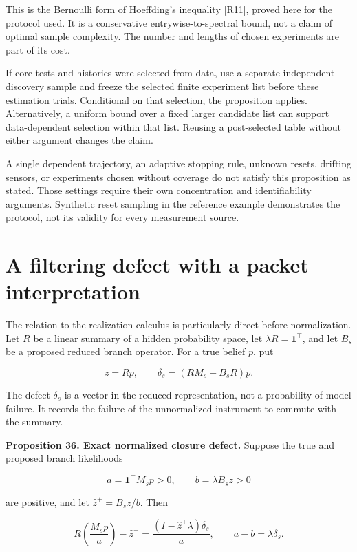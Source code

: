 This is the Bernoulli form of Hoeffding's inequality {[}R11{]}, proved
here for the protocol used. It is a conservative entrywise-to-spectral
bound, not a claim of optimal sample complexity. The number and lengths
of chosen experiments are part of its cost.

If core tests and histories were selected from data, use a separate
independent discovery sample and freeze the selected finite experiment
list before these estimation trials. Conditional on that selection, the
proposition applies. Alternatively, a uniform bound over a fixed larger
candidate list can support data-dependent selection within that list.
Reusing a post-selected table without either argument changes the claim.

A single dependent trajectory, an adaptive stopping rule, unknown
resets, drifting sensors, or experiments chosen without coverage do not
satisfy this proposition as stated. Those settings require their own
concentration and identifiability arguments. Synthetic reset sampling in
the reference example demonstrates the protocol, not its validity for
every measurement source.

\section{A filtering defect with a packet interpretation}\label{LSM:a-filtering-defect-with-a-packet-interpretation}

The relation to the realization calculus is particularly direct before
normalization. Let \(R\) be a linear summary of a hidden probability
space, let \(\lambda R=\mathbf1^\top\), and let \(B_s\) be a proposed
reduced branch operator. For a true belief \(p\), put

\[
z=Rp,\qquad
\delta_s=(RM_s-B_sR)p.
\]

The defect \(\delta_s\) is a vector in the reduced representation, not a
probability of model failure. It records the failure of the unnormalized
instrument to commute with the summary.

\textbf{Proposition 36. Exact normalized closure defect.} Suppose the
true and proposed branch likelihoods

\[
a=\mathbf1^\top M_sp>0,\qquad
b=\lambda B_sz>0
\]

are positive, and let \(\widehat z^+=B_sz/b\). Then

\[
\boxed{
R\left(\frac{M_sp}{a}\right)-\widehat z^+
=\frac{(I-\widehat z^+\lambda)\delta_s}{a},
\qquad a-b=\lambda\delta_s.
}
\]

